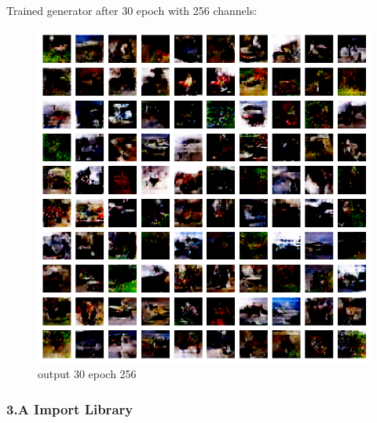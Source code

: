 \documentclass[11pt]{article}
\makeatletter
\def\maxwidth{\ifdim\Gin@nat@width>\linewidth\linewidth
    \else\Gin@nat@width\fi}
\let\Oldincludegraphics\includegraphics
\renewcommand{\includegraphics}[1]{\Oldincludegraphics[width=.8\maxwidth]{#1}}
\makeatother
\begin{document}
Trained generator after 30 epoch with 256 channels:

\begin{figure}
\centering
\includegraphics{wiki/3_4.png}
\caption{output 30 epoch 256}
\end{figure}

    \hypertarget{a-import-library}{%
\subsubsection{3.A Import Library}\label{a-import-library}}
\end{document}
